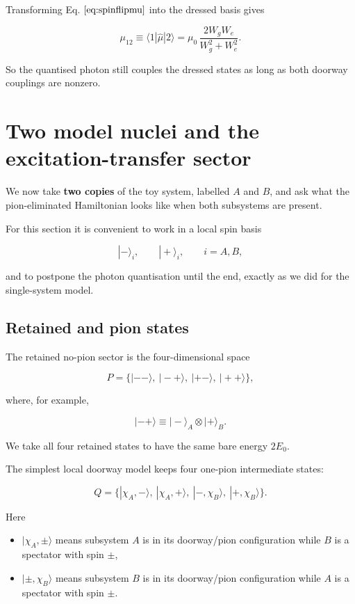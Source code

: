 \documentclass[
]{article}
\renewcommand{\[}{\begin{equation}}
\renewcommand{\]}{\end{equation}}
\providecommand{\tightlist}{%
  \setlength{\itemsep}{0pt}\setlength{\parskip}{0pt}}
\begin{document}
Transforming Eq. \(\ref{eq:spinflipmu}\) into the dressed basis gives

\[
\mu_{12}
\equiv
\langle 1|\hat{\mu}|2\rangle =
\mu_0\,\frac{2W_gW_e}{W_g^2+W_e^2}.
\label{eq:spinflipmu12}
\]

So the quantised photon still couples the dressed states as long as both
doorway couplings are nonzero.

\section{Two model nuclei and the excitation-transfer
sector}\label{two-model-nuclei-and-the-excitation-transfer-sector}

We now take \textbf{two copies} of the toy system, labelled \(A\) and
\(B\), and ask what the pion-eliminated Hamiltonian looks like when both
subsystems are present.

For this section it is convenient to work in a local spin basis

\[
|-\rangle_i,\qquad |+\rangle_i,\qquad i=A,B,
\]

and to postpone the photon quantisation until the end, exactly as we did
for the single-system model.

\subsection{Retained and pion states}\label{retained-and-pion-states}

The retained no-pion sector is the four-dimensional space

\[
P = \{|--\rangle,\ |-+\rangle,\ |+-\rangle,\ |++\rangle\},
\label{eq:ABPspace}
\]

where, for example,

\[
|-+\rangle \equiv |-\rangle_A\otimes |+\rangle_B.
\]

We take all four retained states to have the same bare energy \(2E_0\).

The simplest local doorway model keeps four one-pion intermediate
states:

\[
Q = \{|\chi_A,-\rangle,\ |\chi_A,+\rangle,\ |-,\chi_B\rangle,\ |+,\chi_B\rangle\}.
\label{eq:ABQspace}
\]

Here

\begin{itemize}
\tightlist
\item
  \(|\chi_A,\pm\rangle\) means subsystem \(A\) is in its doorway/pion
  configuration while \(B\) is a spectator with spin \(\pm\),
\item
  \(|\pm,\chi_B\rangle\) means subsystem \(B\) is in its doorway/pion
  configuration while \(A\) is a spectator with spin \(\pm\).
\end{itemize}
\end{document}
